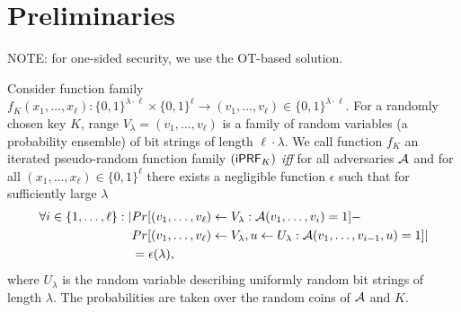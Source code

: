 \section{Preliminaries}
NOTE: for one-sided security, we use the OT-based solution.


\begin{definition}[$\iprf$]
  Consider function family
  $f_K(x_1,\ldots,x_\ell):\{0,1\}^{\lambda\cdot\ell}\times\{0,1\}^{\ell}\rightarrow{}(v_1,\ldots,v_\ell)\in\{0,1\}^{\lambda\cdot\ell}$. For
  a randomly chosen key $K$, range $V_\lambda=(v_1,\ldots,v_\ell)$ is
  a family of random variables (a probability ensemble) of bit strings
  of length $\ell\cdot\lambda$. We call function $f_K$ an iterated
  pseudo-random function family $(\mathsf{i}\mathsf{PRF}_K)$ \emph{iff} for all
  adversaries ${\mathcal{A}}$ and for all $(x_1,\ldots,x_\ell)\in\{0,1\}^\ell$
  there exists a negligible function $\epsilon$ such that for
  sufficiently large $\lambda$
\begin{align*}\forall{}i\in\{1,\ldots,\ell\}:|&Pr[(v_1,\ldots,v_\ell)\leftarrow{}V_\lambda:{\mathcal{A}}(v_1,\ldots,v_i)=1]-\\&Pr[(v_1,\ldots,v_\ell)\leftarrow{}V_\lambda,u\leftarrow{}U_\lambda:{\mathcal{A}}(v_1,\ldots,v_{i-1},u)=1]|\\&=\epsilon(\lambda),
  \end{align*}
  where $U_\lambda$ is the random variable describing uniformly random
  bit strings of length $\lambda$. The probabilities are taken over
  the random coins of ${\mathcal{A}}$ and $K$.

\end{definition}

